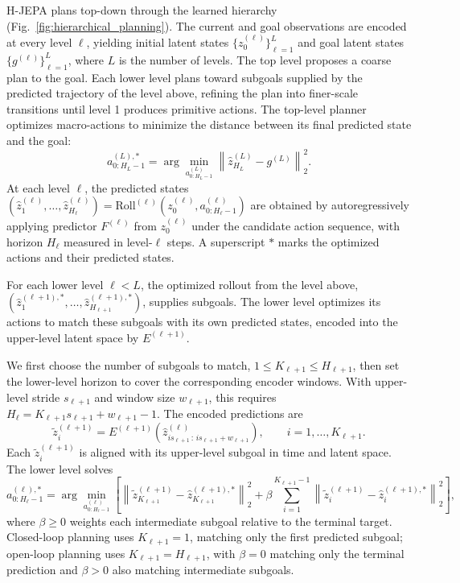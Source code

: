 H-JEPA plans top-down through the learned hierarchy
(Fig.~\ref{fig:hierarchical_planning}). The current and goal observations
are encoded at every level $\ell$, yielding initial latent states
$\{z^{(\ell)}_0\}_{\ell=1}^L$ and goal latent states
$\{g^{(\ell)}\}_{\ell=1}^L$, where $L$ is the number of levels.
The top level proposes a coarse plan to the goal. Each lower level plans
toward subgoals supplied by the predicted trajectory of the level above,
refining the plan into finer-scale transitions until level 1
produces primitive actions.
The top-level planner optimizes macro-actions to minimize the distance
between its final predicted state and the goal:
\begin{equation}
\label{eq:top-plan}
a^{(L),*}_{0:H_L-1}
= \arg\min_{a^{(L)}_{0:H_L-1}}
\left\|\hat{z}^{(L)}_{H_L}-g^{(L)}\right\|_2^2.
\end{equation}
At each level $\ell$, the predicted states
$(\hat{z}^{(\ell)}_1,\ldots,\hat{z}^{(\ell)}_{H_\ell})
= \mathrm{Roll}^{(\ell)}(z^{(\ell)}_0,a^{(\ell)}_{0:H_\ell-1})$
are obtained by autoregressively applying predictor $F^{(\ell)}$ from
$z^{(\ell)}_0$ under the candidate action sequence, with horizon $H_\ell$
measured in level-$\ell$ steps. A superscript $*$ marks the optimized
actions and their predicted states.

For each lower level $\ell<L$, the optimized rollout from the level above,
$(\hat{z}^{(\ell+1),*}_1,\ldots,\hat{z}^{(\ell+1),*}_{H_{\ell+1}})$,
supplies subgoals. The lower level optimizes its actions to match these
subgoals with its own predicted states, encoded into the upper-level latent
space by $E^{(\ell+1)}$.

We first choose the number of subgoals to match,
$1\le K_{\ell+1}\le H_{\ell+1}$, then set the lower-level horizon to cover
the corresponding encoder windows. With upper-level stride $s_{\ell+1}$
and window size $w_{\ell+1}$, this requires
$H_\ell=K_{\ell+1}s_{\ell+1}+w_{\ell+1}-1$. The encoded predictions are
\begin{equation}
\label{eq:lift}
\tilde{z}^{(\ell+1)}_i
= E^{(\ell+1)}\!\left(
\hat{z}^{(\ell)}_{i s_{\ell+1}\,:\,i s_{\ell+1}+w_{\ell+1}}\right),
\qquad i=1,\ldots,K_{\ell+1}.
\end{equation}
Each $\tilde{z}^{(\ell+1)}_i$ is aligned with its upper-level subgoal in time and latent space.
The lower level solves
\begin{equation}
\label{eq:lower-plan}
a^{(\ell),*}_{0:H_\ell-1}
= \arg\min_{a^{(\ell)}_{0:H_\ell-1}}
\left[
\left\|\tilde{z}^{(\ell+1)}_{K_{\ell+1}}-\hat{z}^{(\ell+1),*}_{K_{\ell+1}}\right\|_2^2
+ \beta\sum_{i=1}^{K_{\ell+1}-1}
\left\|\tilde{z}^{(\ell+1)}_i-\hat{z}^{(\ell+1),*}_i\right\|_2^2
\right],
\end{equation}
where $\beta\ge0$ weights each intermediate subgoal relative to the terminal
target. Closed-loop planning uses $K_{\ell+1}=1$, matching only the first
predicted subgoal; open-loop planning uses $K_{\ell+1}=H_{\ell+1}$, with
$\beta=0$ matching only the terminal prediction and $\beta>0$ also matching
intermediate subgoals.

